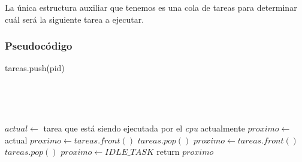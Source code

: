 La única estructura auxiliar que tenemos es una cola de tareas para determinar cuál será la siguiente tarea a ejecutar.

\subsubsection{Pseudocódigo}

\begin{algorithmic}
      \State tareas.push(pid)
  \EndFunction
\end{algorithmic}

~

~

\begin{algorithmic}
      \State $actual \gets$ tarea que está siendo ejecutada por el \emph{cpu} actualmente
      \State $proximo \gets$ actual
           \State $proximo \gets tareas.front()$
	   \State $tareas.pop()$
      \EndIf
		\State $proximo \gets tareas.front()$
		\State $tareas.pop()$
	   \Else
		\State $proximo \gets IDLE\_TASK$
	   \EndIf
      \EndIf
      \State return $proximo$
  \EndFunction
\end{algorithmic}




